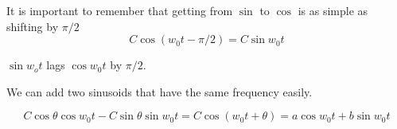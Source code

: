It is important to remember that getting from $\sin$ to $\cos$ is as simple as shifting by $\pi/2$
\begin{equation}
    C \cos(w_0 t - \pi/2) = C \sin w_0 t
\end{equation}

$\sin w_o t$ lags $\cos w_0 t$ by $\pi/2$.

We can add two sinusoids that have the same frequency easily.

\begin{equation}
    C \cos \theta \cos w_0 t - C \sin \theta \sin w_0 t = C \cos (w_0 t + \theta) = a \cos w_0 t + b \sin w_0 t 
\end{equation}

